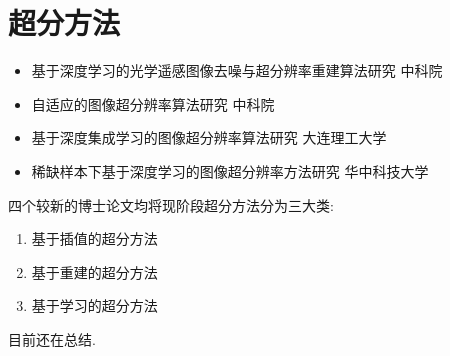 \section{超分方法}

\begin{itemize}
    \item \cite{paper01} 基于深度学习的光学遥感图像去噪与超分辨率重建算法研究 中科院
    \item \cite{paper02} 自适应的图像超分辨率算法研究 中科院
    \item \cite{paper03} 基于深度集成学习的图像超分辨率算法研究 大连理工大学
    \item \cite{paper04} 稀缺样本下基于深度学习的图像超分辨率方法研究 华中科技大学
\end{itemize}

四个较新的博士论文均将现阶段超分方法分为三大类:

\begin{enumerate}
    \item 基于插值的超分方法
    \item 基于重建的超分方法
    \item 基于学习的超分方法
\end{enumerate}

目前还在总结.
